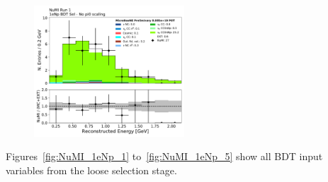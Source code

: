 \begin{figure}[H]
    \begin{center}
    \includegraphics[width=0.5\textwidth]{Sidebands/Figures/NuMI/1eNp/BDTSel/reco_e.pdf}
    \caption{}
    \label{fig:NuMI_1eNp_reco_e}
    \end{center}
\end{figure}



Figures~\ref{fig:NuMI_1eNp_1} to~\ref{fig:NuMI_1eNp_5} show all BDT input variables from the   loose selection stage.

